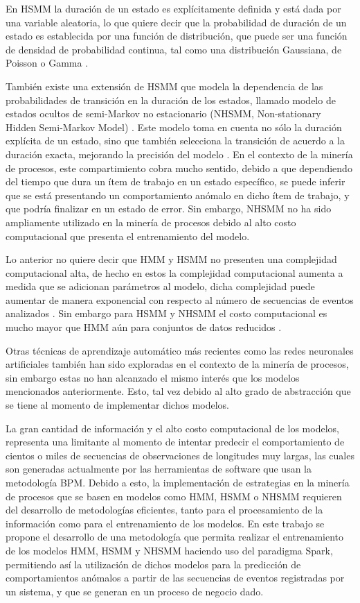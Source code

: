 En HSMM la duración de un estado es explícitamente definida y está dada por una variable aleatoria, lo que quiere decir que la probabilidad de duración de un estado es establecida por una función de distribución, que puede ser una función de densidad de probabilidad continua, tal como una distribución Gaussiana, de Poisson o Gamma \cite{Marhasev2006}. 

También existe una extensión de HSMM que modela la dependencia de las probabilidades de transición en la duración de los estados, llamado modelo de estados ocultos de semi-Markov no estacionario (NHSMM, Non-stationary Hidden Semi-Markov Model) \cite{Marhasev2006}. Este modelo toma en cuenta no sólo la duración explícita de un estado, sino que también selecciona la transición de acuerdo a la duración exacta, mejorando la precisión del modelo \cite{Marhasev2006}. En el contexto de la minería de procesos, este compartimiento cobra mucho sentido, debido a que dependiendo del tiempo que dura un ítem de trabajo en un estado específico, se puede inferir que se está presentando un comportamiento anómalo en dicho ítem de trabajo, y que podría finalizar en un estado de error. Sin embargo, NHSMM no ha sido ampliamente utilizado en la minería de procesos debido al alto costo computacional que presenta el entrenamiento del modelo.

Lo anterior no quiere decir que HMM y HSMM no presenten una complejidad computacional alta, de hecho en estos la complejidad computacional aumenta a medida que se adicionan parámetros al modelo, dicha complejidad puede aumentar de manera exponencial con respecto al número de secuencias de eventos analizados \cite{Maurer2014}. Sin embargo para HSMM y NHSMM el costo computacional es mucho mayor que HMM aún para conjuntos de datos reducidos \cite{Johnson2005}.

Otras técnicas de aprendizaje automático más recientes como las redes neuronales artificiales también han sido exploradas en el contexto de la minería de procesos, sin embargo estas no han alcanzado el mismo interés que los modelos mencionados anteriormente. Esto, tal vez debido al alto grado de abstracción que se tiene al momento de implementar dichos modelos. 

La gran cantidad de información y el alto costo computacional de los modelos, representa una limitante al momento de intentar predecir el comportamiento de cientos o miles de secuencias de observaciones de longitudes muy largas, las cuales son generadas actualmente por las herramientas de software que usan la metodología BPM. Debido a esto, la implementación de estrategias en la minería de procesos que se basen en modelos como HMM, HSMM o NHSMM requieren del desarrollo de metodologías eficientes, tanto para el procesamiento de la información como para el entrenamiento de los modelos. En este trabajo se propone el desarrollo de una metodología que permita realizar el entrenamiento de los modelos HMM, HSMM y NHSMM haciendo uso del paradigma Spark, permitiendo así la utilización de dichos modelos para la predicción de comportamientos anómalos a partir de las secuencias de eventos registradas por un sistema, y que se generan en un proceso de negocio dado.

